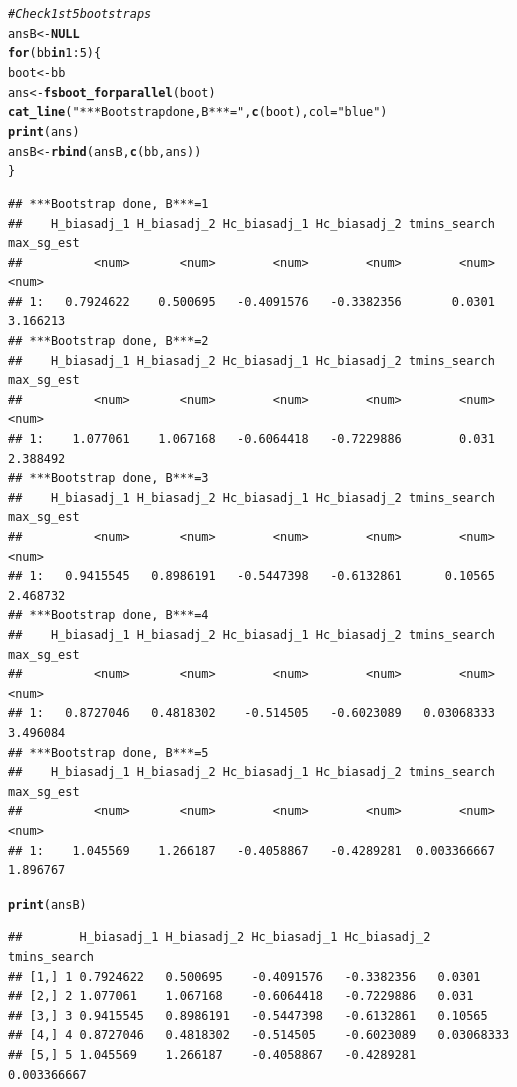 \documentclass[12pt]{article}
\makeatletter
\newcommand{\hlnum}[1]{\textcolor[rgb]{0.686,0.059,0.569}{#1}}%
\newcommand{\hlstr}[1]{\textcolor[rgb]{0.192,0.494,0.8}{#1}}%
\newcommand{\hlcom}[1]{\textcolor[rgb]{0.678,0.584,0.686}{\textit{#1}}}%
\newcommand{\hlopt}[1]{\textcolor[rgb]{0,0,0}{#1}}%
\newcommand{\hlstd}[1]{\textcolor[rgb]{0.345,0.345,0.345}{#1}}%
\newcommand{\hlkwa}[1]{\textcolor[rgb]{0.161,0.373,0.58}{\textbf{#1}}}%
\newcommand{\hlkwb}[1]{\textcolor[rgb]{0.69,0.353,0.396}{#1}}%
\newcommand{\hlkwc}[1]{\textcolor[rgb]{0.333,0.667,0.333}{#1}}%
\newcommand{\hlkwd}[1]{\textcolor[rgb]{0.737,0.353,0.396}{\textbf{#1}}}%
\newenvironment{kframe}{%
 \def\at@end@of@kframe{}%
 \ifinner\ifhmode%
  \def\at@end@of@kframe{\end{minipage}}%
  \begin{minipage}{\columnwidth}%
 \fi\fi%
 \def\FrameCommand##1{\hskip\@totalleftmargin \hskip-\fboxsep
 \colorbox{shadecolor}{##1}\hskip-\fboxsep
     \hskip-\linewidth \hskip-\@totalleftmargin \hskip\columnwidth}%
 \MakeFramed {\advance\hsize-\width
   \@totalleftmargin\z@ \linewidth\hsize
   \@setminipage}}%
 {\par\unskip\endMakeFramed%
 \at@end@of@kframe}
\newenvironment{knitrout}{}{} %
\makeatother
\begin{document}
\begin{knitrout}
\begin{kframe}
\begin{alltt}
\hlcom{# Check 1st 5 bootstraps}
\hlstd{ansB} \hlkwb{<-} \hlkwa{NULL}
\hlkwa{for} \hlstd{(bb} \hlkwa{in} \hlnum{1}\hlopt{:}\hlnum{5}\hlstd{) \{}
    \hlstd{boot} \hlkwb{<-} \hlstd{bb}
    \hlstd{ans} \hlkwb{<-} \hlkwd{fsboot_forparallel}\hlstd{(boot)}
    \hlkwd{cat_line}\hlstd{(}\hlstr{"***Bootstrap done, B***="}\hlstd{,} \hlkwd{c}\hlstd{(boot),} \hlkwc{col} \hlstd{=} \hlstr{"blue"}\hlstd{)}
    \hlkwd{print}\hlstd{(ans)}
    \hlstd{ansB} \hlkwb{<-} \hlkwd{rbind}\hlstd{(ansB,} \hlkwd{c}\hlstd{(bb, ans))}
\hlstd{\}}
\end{alltt}
\begin{verbatim}
## ***Bootstrap done, B***=1
##    H_biasadj_1 H_biasadj_2 Hc_biasadj_1 Hc_biasadj_2 tmins_search max_sg_est
##          <num>       <num>        <num>        <num>        <num>      <num>
## 1:   0.7924622    0.500695   -0.4091576   -0.3382356       0.0301   3.166213
## ***Bootstrap done, B***=2
##    H_biasadj_1 H_biasadj_2 Hc_biasadj_1 Hc_biasadj_2 tmins_search max_sg_est
##          <num>       <num>        <num>        <num>        <num>      <num>
## 1:    1.077061    1.067168   -0.6064418   -0.7229886        0.031   2.388492
## ***Bootstrap done, B***=3
##    H_biasadj_1 H_biasadj_2 Hc_biasadj_1 Hc_biasadj_2 tmins_search max_sg_est
##          <num>       <num>        <num>        <num>        <num>      <num>
## 1:   0.9415545   0.8986191   -0.5447398   -0.6132861      0.10565   2.468732
## ***Bootstrap done, B***=4
##    H_biasadj_1 H_biasadj_2 Hc_biasadj_1 Hc_biasadj_2 tmins_search max_sg_est
##          <num>       <num>        <num>        <num>        <num>      <num>
## 1:   0.8727046   0.4818302    -0.514505   -0.6023089   0.03068333   3.496084
## ***Bootstrap done, B***=5
##    H_biasadj_1 H_biasadj_2 Hc_biasadj_1 Hc_biasadj_2 tmins_search max_sg_est
##          <num>       <num>        <num>        <num>        <num>      <num>
## 1:    1.045569    1.266187   -0.4058867   -0.4289281  0.003366667   1.896767
\end{verbatim}
\begin{alltt}
\hlkwd{print}\hlstd{(ansB)}
\end{alltt}
\begin{verbatim}
##        H_biasadj_1 H_biasadj_2 Hc_biasadj_1 Hc_biasadj_2 tmins_search
## [1,] 1 0.7924622   0.500695    -0.4091576   -0.3382356   0.0301      
## [2,] 2 1.077061    1.067168    -0.6064418   -0.7229886   0.031       
## [3,] 3 0.9415545   0.8986191   -0.5447398   -0.6132861   0.10565     
## [4,] 4 0.8727046   0.4818302   -0.514505    -0.6023089   0.03068333  
## [5,] 5 1.045569    1.266187    -0.4058867   -0.4289281   0.003366667 

\end{verbatim}
\end{kframe}
\end{knitrout}
\end{document}
